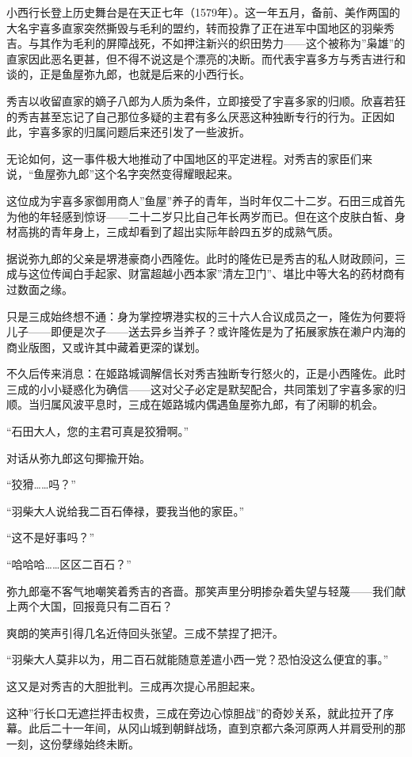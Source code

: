 \documentclass[
]{book}
\begin{document}
小西行长登上历史舞台是在天正七年（1579年）。这一年五月，备前、美作两国的大名宇喜多直家突然撕毁与毛利的盟约，转而投靠了正在进军中国地区的羽柴秀吉。与其作为毛利的屏障战死，不如押注新兴的织田势力------这个被称为''枭雄''的直家因此恶名更甚，但不得不说这是个漂亮的决断。而代表宇喜多方与秀吉进行和谈的，正是鱼屋弥九郎，也就是后来的小西行长。

秀吉以收留直家的嫡子八郎为人质为条件，立即接受了宇喜多家的归顺。欣喜若狂的秀吉甚至忘记了自己那位多疑的主君有多么厌恶这种独断专行的行为。正因如此，宇喜多家的归属问题后来还引发了一些波折。

无论如何，这一事件极大地推动了中国地区的平定进程。对秀吉的家臣们来说，``鱼屋弥九郎''这个名字突然变得耀眼起来。

这位成为宇喜多家御用商人''鱼屋''养子的青年，当时年仅二十二岁。石田三成首先为他的年轻感到惊讶------二十二岁只比自己年长两岁而已。但在这个皮肤白皙、身材高挑的青年身上，三成却看到了超出实际年龄四五岁的成熟气质。

据说弥九郎的父亲是堺港豪商小西隆佐。此时的隆佐已是秀吉的私人财政顾问，三成与这位传闻白手起家、财富超越小西本家''清左卫门''、堪比中等大名的药材商有过数面之缘。

只是三成始终想不通：身为掌控堺港实权的三十六人合议成员之一，隆佐为何要将儿子------即便是次子------送去异乡当养子？或许隆佐是为了拓展家族在濑户内海的商业版图，又或许其中藏着更深的谋划。

不久后传来消息：在姬路城调解信长对秀吉独断专行怒火的，正是小西隆佐。此时三成的小小疑惑化为确信------这对父子必定是默契配合，共同策划了宇喜多家的归顺。当归属风波平息时，三成在姬路城内偶遇鱼屋弥九郎，有了闲聊的机会。

``石田大人，您的主君可真是狡猾啊。''

对话从弥九郎这句揶揄开始。

``狡猾\ldots\ldots 吗？''

``羽柴大人说给我二百石俸禄，要我当他的家臣。''

``这不是好事吗？''

``哈哈哈\ldots\ldots 区区二百石？''

弥九郎毫不客气地嘲笑着秀吉的吝啬。那笑声里分明掺杂着失望与轻蔑------我们献上两个大国，回报竟只有二百石？

爽朗的笑声引得几名近侍回头张望。三成不禁捏了把汗。

``羽柴大人莫非以为，用二百石就能随意差遣小西一党？恐怕没这么便宜的事。''

这又是对秀吉的大胆批判。三成再次提心吊胆起来。

这种''行长口无遮拦抨击权贵，三成在旁边心惊胆战''的奇妙关系，就此拉开了序幕。此后二十一年间，从冈山城到朝鲜战场，直到京都六条河原两人并肩受刑的那一刻，这份孽缘始终未断。
\end{document}
